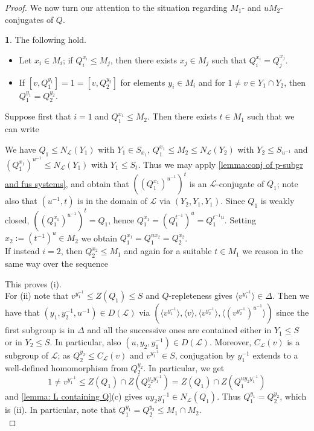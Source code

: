 \documentclass{amsart}
\numberwithin{equation}{section}
\theoremstyle{definition}
\theoremstyle{subresult}
\newtheorem{subresult}{}[equation]
\theoremstyle{caseresult}
\renewcommand{\L}{\mathcal{L}}
\newcommand{\inv}{^{-1}}
\newcommand{\<}{\langle}
\renewcommand{\>}{\rangle}
\begin{document}
\begin{proof}
	We now turn our attention to the situation regarding $M_1$- and $uM_2$- conjugates of $Q$. 	
	\begin{subresult}\label{subres:4.14-conjugates of Q}
		The following hold.
		\begin{itemize} 
			\item[(i)] Let $x_i \in M_i$; if $Q_i^{x_i} \le M_j$, then there exists $x_j \in M_j$ such that $Q_i^{x_i} = Q_j^{x_j}$.
			\item[(ii)] If $[v,Q_1^{y_1}]=1=[v,Q_2^{y_2}]$ for elements $y_i \in M_i$ and for $1 \ne v \in Y_1 \cap Y_2$, then $Q_1^{y_1}=Q_2^{y_2}$.
		\end{itemize}
	\end{subresult}
	Suppose first that $i=1$ and $Q_1^{x_1} \le M_2$. Then there exists $t \in M_1$ such that we can write
	\begin{center}
	\end{center}
	We have $Q_1 \le N_\L(Y_1)$ with $Y_1 \in S_{x_1}$, $Q_1^{x_1} \le M_2 \le N_\L(Y_2)$ with $Y_2 \le S_{u\inv}$ and $(Q_1^{x_1})^{u\inv} \le N_\L(Y_1)$ with $Y_1 \le S_t$. Thus we may apply \ref{lemma:conj of p-subgr and fus systems}, and obtain that $((Q_1^{x_1})^{u\inv})^t$ is an $\L$-conjugate of $Q_1$; note also that $(u\inv,t)$ is in the domain of $\L$ via $(Y_2,Y_1,Y_1)$. Since $Q_1$ is weakly closed, $((Q_1^{x_1})^{u\inv})^t = Q_1$, hence $Q_1^{x_1} = (Q_1^{t\inv})^u = Q_1^{t\inv u}$. Setting $x_2 := (t\inv)^u \in M_2$ we obtain $Q_1^{x_1} = Q_1^{u x_2} = Q_2^{x_2}$.\\
	If instead $i=2$, then $Q_2^{x_2} \le M_1$ and again for a suitable $t \in M_1$ we reason in the same way over the sequence
	\begin{center}
	\end{center}
	This proves (i).\\
	For (ii) note that $v^{y_1 \inv} \le Z(Q_1) \le S$ and $Q$-repleteness gives $\<v^{y_1\inv}\> \in \Delta$. Then we have that $(y_1,y_2\inv,u\inv) \in D(\L)$ via $(\<v^{y_1\inv}\>, \< v\>, \< v^{y_2\inv} \>,  \< (v^{y_2\inv})^{u\inv} \>)$ since the first subgroup is in $\Delta$ and all the successive ones are contained either in $Y_1 \le S$ or in $Y_2 \le S$. In particular, also $(u,y_2,y_1\inv) \in D(\L)$. Moreover, $C_\L(v)$ is a subgroup of $\L$; as $Q_2^{y_2} \le C_\L(v)$ and $v^{y_1\inv} \in S$, conjugation by $y_1\inv$ extends to a well-defined homomorphism from $Q_2^{y_2}$. In particular, we get
	\[
	1 \ne v^{y_1\inv} \le Z(Q_1) \cap Z(Q_2^{y_2y_1\inv}) = Z(Q_1) \cap Z(Q_1^{uy_2y_1\inv})
	\]
	and \ref{lemma: L containing Q}(c) gives $uy_2y_1\inv \in N_\L(Q_1)$. Thus $Q_1^{y_1} = Q_2^{y_2}$, which is (ii). In particular, note that $Q_1^{y_1} = Q_2^{y_2} \le M_1 \cap M_2$.\\
	

\end{proof}
\end{document}
